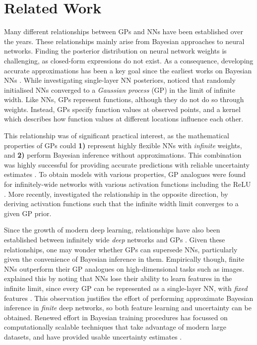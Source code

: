 \section{Related Work}
\label{section:dnn-for-dgps:related-work}
Many different relationships between GPs and NNs have been established over the years. These relationships mainly arise from Bayesian approaches to neural networks. %
Finding the posterior distribution on neural network weights is challenging, as closed-form expressions do not exist. As a consequence, developing accurate approximations has been a key goal since the earliest works on Bayesian NNs \citep{mackay1992practical}.
While investigating single-layer NN posteriors, \citet{neal1996bayesian} noticed that randomly initialised NNs converged to a \emph{Gaussian process} (GP) in the limit of infinite width.
Like NNs, GPs represent functions, although they do not do so through weights. Instead, GPs specify function values at observed points, and a kernel which describes how function values at different locations influence each other.

This relationship was of significant practical interest, as the mathematical properties of GPs could \textbf{1)} represent highly flexible NNs with \emph{infinite} weights, and \textbf{2)} perform Bayesian inference without approximations.
This combination was highly successful for providing accurate predictions with reliable uncertainty estimates \citep{williams1996gaussian,rasmussen1997evaluation}.
To obtain models with various properties, GP analogues were found for infinitely-wide networks with various activation functions \citep{williams1998computation} including the ReLU \citep{cho2009kernel}. More recently, \citet{Meronen2020} investigated the relationship in the opposite direction, by deriving activation functions such that the infinite width limit converges to a given GP prior.

Since the growth of modern deep learning, relationships have also been established between infinitely wide \emph{deep} networks and GPs \citep{matthews2018gaussian,lee2018dnnlimit,yang2019wide}. Given these relationships, one may wonder whether GPs can supersede NNs, particularly given the convenience of Bayesian inference in them. Empirically though, finite NNs outperform their GP analogues \citep{lee2018dnnlimit,garriga2018deep,novak2018bayesian} on high-dimensional tasks such as images. \citet{mackay1992practical} explained this by noting that NNs lose their ability to learn features in the infinite limit, since every GP can be represented as a single-layer NN, with \emph{fixed} features \citep{mercer1909,rasmussen2006}.
This observation justifies the effort of performing approximate Bayesian inference in \emph{finite} deep networks, so both feature learning and uncertainty can be obtained. Renewed effort in Bayesian training procedures has focussed on computationally scalable techniques that take advantage of modern large datasets, and have provided usable uncertainty estimates \citep[e.g.,][]{Kingma2015local,blundell2015,Gal2016dropout,louizos2016}.

